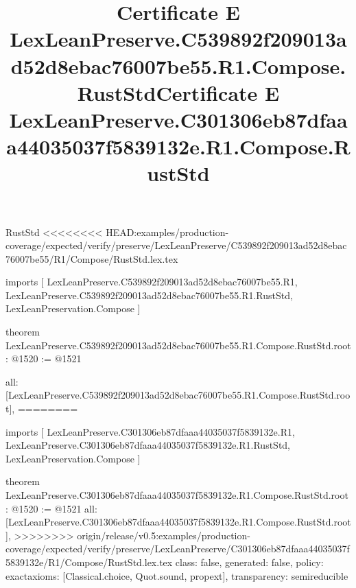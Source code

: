 \begin{lexlean}{RustStd}
<<<<<<<< HEAD:examples/production-coverage/expected/verify/preserve/LexLeanPreserve/C539892f209013ad52d8ebac76007be55/R1/Compose/RustStd.lex.tex
\title{Certificate E LexLeanPreserve.C539892f209013ad52d8ebac76007be55.R1.Compose.RustStd}
\begin{coremodule}
imports [
  LexLeanPreserve.C539892f209013ad52d8ebac76007be55.R1,
  LexLeanPreserve.C539892f209013ad52d8ebac76007be55.R1.RustStd,
  LexLeanPreservation.Compose
]

theorem LexLeanPreserve.C539892f209013ad52d8ebac76007be55.R1.Compose.RustStd.root : @1520 := @1521 {
  all: [LexLeanPreserve.C539892f209013ad52d8ebac76007be55.R1.Compose.RustStd.root],
========
\title{Certificate E LexLeanPreserve.C301306eb87dfaaa44035037f5839132e.R1.Compose.RustStd}
\begin{coremodule}
imports [
  LexLeanPreserve.C301306eb87dfaaa44035037f5839132e.R1,
  LexLeanPreserve.C301306eb87dfaaa44035037f5839132e.R1.RustStd,
  LexLeanPreservation.Compose
]

theorem LexLeanPreserve.C301306eb87dfaaa44035037f5839132e.R1.Compose.RustStd.root : @1520 := @1521 {
  all: [LexLeanPreserve.C301306eb87dfaaa44035037f5839132e.R1.Compose.RustStd.root],
>>>>>>>> origin/release/v0.5:examples/production-coverage/expected/verify/preserve/LexLeanPreserve/C301306eb87dfaaa44035037f5839132e/R1/Compose/RustStd.lex.tex
  class: false,
  generated: false,
  policy: exact{axioms: [Classical.choice, Quot.sound, propext]},
  transparency: semireducible
}


\end{coremodule}}
\end{coremodule}
\end{lexlean}
